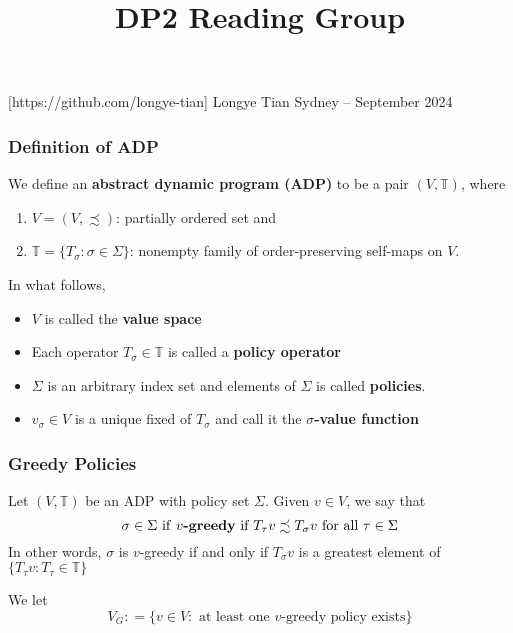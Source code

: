 \documentclass[11pt,xcolor={dvipsnames},hyperref={pdftex,pdfpagemode=UseNone,hidelinks,pdfdisplaydoctitle=true},usepdftitle=false]{beamer}
\begin{document}
\title{DP2 Reading Group}

\information
%
[https://github.com/longye-tian]
%
{Longye Tian}
%
{Sydney -- September 2024}

\frame{\titlepage}


\begin{frame}
\frametitle{Definition of ADP}
\begin{definition}
We define an \textbf{abstract dynamic program (ADP)} to be a pair $(V, \mathbb{T})$, where
\begin{enumerate}
\item $V = (V, \precsim)$: partially ordered set and
\item $\mathbb{T} = \{T_\sigma: \sigma\in\Sigma\}$: nonempty family of order-preserving self-maps on $V$.
\end{enumerate}
In what follows,
\begin{itemize}
\item $V$ is called the \textbf{value space}
\item Each operator $T_\sigma\in\mathbb{T}$ is called a \textbf{policy operator}
\item $\Sigma$ is an arbitrary index set and elements of $\Sigma$ is called \textbf{policies}.
\item $v_\sigma\in V$ is a unique fixed of $T_\sigma$ and call it the \textbf{$\sigma$-value function}
\end{itemize}
\end{definition}
\end{frame}




\begin{frame}
\frametitle{Greedy Policies}
\begin{definition}
Let $(V,\mathbb{T})$ be an ADP with policy set $\Sigma$. Given $v\in V$, we say that
$$
\sigma\in\Sigma \text{ if \textbf{$v$-greedy} if $T_\tau v\precsim T_\sigma v$ for all $\tau\in\Sigma$}
$$
In other words, $\sigma$ is $v$-greedy if and only if $T_\sigma v$ is a greatest element of $\{T_\tau v: T_\tau\in\mathbb{T}\}$
\end{definition}
\begin{remark}
We let 
$$
V_G: =\{v\in V: \text{ at least one $v$-greedy policy exists}\}
$$
\end{remark}
\end{frame}
\end{document}
